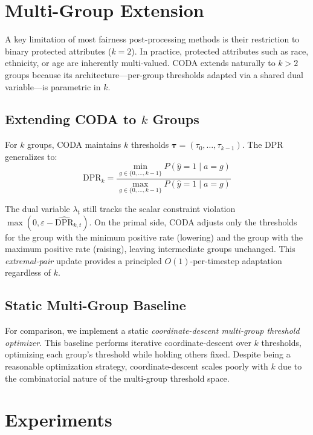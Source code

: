 \documentclass[10pt,twocolumn]{article}
\theoremstyle{definition}
\begin{document}
\section{Multi-Group Extension}
\label{sec:multigroup}

A key limitation of most fairness post-processing methods is their restriction to binary protected attributes ($k=2$). In practice, protected attributes such as race, ethnicity, or age are inherently multi-valued. CODA extends naturally to $k > 2$ groups because its architecture---per-group thresholds adapted via a shared dual variable---is parametric in $k$.

\subsection{Extending CODA to $k$ Groups}
For $k$ groups, CODA maintains $k$ thresholds $\boldsymbol{\tau} = (\tau_0, \ldots, \tau_{k-1})$. The DPR generalizes to:
\begin{equation}
\text{DPR}_k = \frac{\min_{g \in \{0,\ldots,k-1\}} P(\hat{y}=1 \mid a=g)}{\max_{g \in \{0,\ldots,k-1\}} P(\hat{y}=1 \mid a=g)}
\end{equation}

The dual variable $\lambda_t$ still tracks the scalar constraint violation $\max(0, \varepsilon - \widehat{\text{DPR}}_{k,t})$. On the primal side, CODA adjusts only the thresholds for the group with the minimum positive rate (lowering) and the group with the maximum positive rate (raising), leaving intermediate groups unchanged. This \emph{extremal-pair} update provides a principled $O(1)$-per-timestep adaptation regardless of $k$.

\subsection{Static Multi-Group Baseline}
For comparison, we implement a static \emph{coordinate-descent multi-group threshold optimizer}. This baseline performs iterative coordinate-descent over $k$ thresholds, optimizing each group's threshold while holding others fixed. Despite being a reasonable optimization strategy, coordinate-descent scales poorly with $k$ due to the combinatorial nature of the multi-group threshold space.

\section{Experiments}
\label{sec:experiments}
\end{document}
